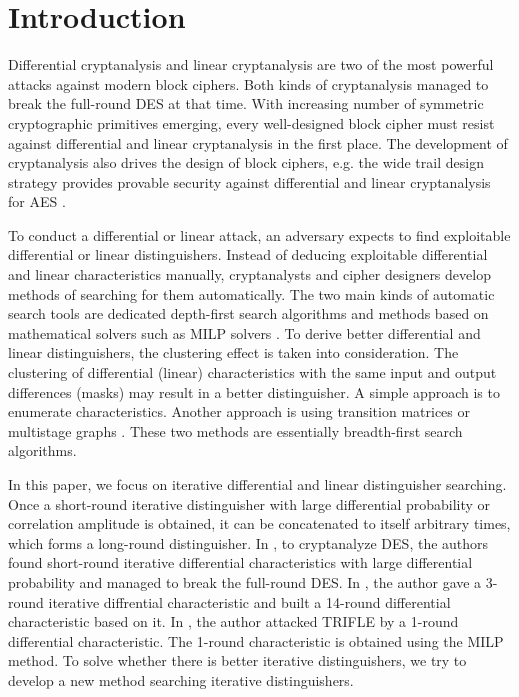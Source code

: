 \section{Introduction}

Differential cryptanalysis \cite{biham1991differential} and linear cryptanalysis \cite{matsui1993linear} are two of the most powerful attacks against modern block ciphers. Both kinds of cryptanalysis managed to break the full-round DES at that time. With increasing number of symmetric cryptographic primitives emerging, every well-designed block cipher must resist against differential and linear cryptanalysis in the first place. The development of cryptanalysis also drives the design of block ciphers, e.g. the wide trail design strategy provides provable security against differential and linear cryptanalysis for AES \cite{daemen2002design}. 

To conduct a differential or linear attack, an adversary expects to find exploitable differential or linear distinguishers. Instead of deducing  exploitable differential and linear characteristics manually, cryptanalysts and cipher designers develop methods of searching for them automatically. The two main kinds of automatic search tools are dedicated depth-first search algorithms \cite{matsui1994correlation,ohta1995improving,aoki1997best,bao2014speeding,dobraunig2015heuristic} and methods based on mathematical solvers such as MILP solvers \cite{mouha2011differential,sun2013automatic,sun2014automatic,sun2014towards,zhou2019improving}. To derive better differential and linear distinguishers, the clustering effect is taken into consideration. The clustering of differential (linear) characteristics with the same input and output differences (masks) may result in a better distinguisher. A simple approach is to enumerate characteristics. Another approach is using transition matrices \cite{abdelraheem2012estimating} or multistage graphs \cite{EPRINT:HalVej18}. These two methods are essentially breadth-first search algorithms.

In this paper, we focus on iterative differential and linear distinguisher searching. Once a short-round iterative distinguisher with large differential probability or correlation amplitude is obtained, it can be concatenated to itself arbitrary times, which forms a long-round distinguisher. In \cite{biham1991differential,biham1992differential,knudsen1992iterative}, to cryptanalyze DES, the authors found short-round iterative differential characteristics with large differential probability and managed to break the full-round DES. In \cite{wang2008differential}, the author gave a 3-round iterative diffrential characteristic and built a 14-round differential characteristic based on it. In \cite{liu2019iterative}, the author attacked TRIFLE by a 1-round differential characteristic. The 1-round characteristic is obtained using the MILP method. To solve whether there is better iterative distinguishers, we try to develop a new method searching iterative distinguishers. 

